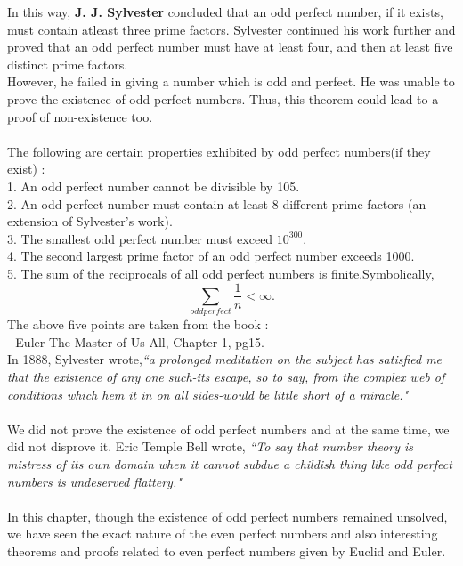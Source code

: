 \documentclass[a4paper,11pt]{article}
\begin{document}
In this way, \textbf{J. J. Sylvester} concluded that an odd perfect number, if it exists, must contain atleast three prime factors.
Sylvester continued his work further and proved that an odd perfect number must have at least four, and then at least five distinct prime factors. \\
\indent However, he failed in giving a number which is odd and perfect. He was unable to prove the existence of odd perfect numbers. Thus, this theorem could lead to a proof of non-existence too.\\
\\
The following are certain properties exhibited by odd perfect numbers(if they exist) :\\
1. An odd perfect number cannot be divisible by 105. \\
2. An odd perfect number must contain at least 8 different prime factors (an 
extension of Sylvester's work). \\
3. The smallest odd perfect number must exceed $10^{300}$.\\
4. The second largest prime factor of an odd perfect number exceeds 1000. \\
5. The sum of the reciprocals of all odd perfect numbers is finite.Symbolically,
$$ \sum_{odd perfect} \frac{1}{n} < \infty.$$
The above five points are taken from the book :\\
\vspace{2ex}
\hfill {- Euler-The Master of Us All, Chapter 1, pg15.}\\
\noindent In 1888, Sylvester wrote,\textit {``a prolonged meditation on the subject has satisfied me that the 
existence of any one such-its escape, so to say, from the complex 
web of conditions which hem it in on all sides-would be little short 
of a miracle."}\\
\\
We did not prove the existence of odd perfect numbers and at the same time, we did not disprove it. Eric Temple Bell wrote, \textit{``To 
say that number theory is mistress of its own domain when it cannot subdue 
a childish thing like odd perfect numbers is undeserved flattery."} \\
\\
In this chapter, though the existence of odd perfect numbers remained unsolved, we have seen the exact nature of the even perfect numbers and also interesting theorems and proofs related to even perfect numbers given by Euclid and Euler.\\












 
\end{document}
